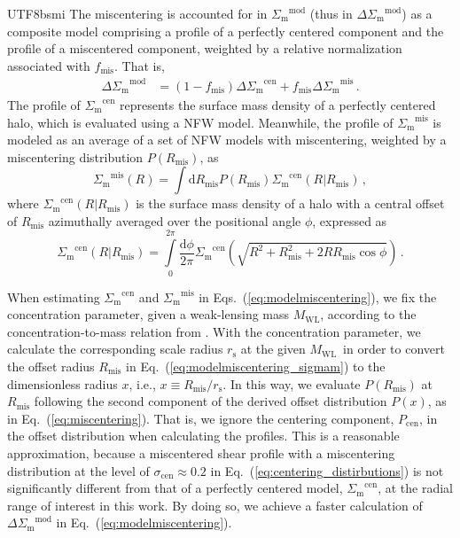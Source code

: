 \documentclass[longauth]{aa}
\newcommand{\dif}{\ensuremath{\mathrm{d}}}
\newcommand{\deltaSigma}{\ensuremath{\Delta{\Sigma}_{\mathrm{m}}}}
\newcommand{\Sigmam}{\ensuremath{{\Sigma}_{\mathrm{m}}}}
\newcommand{\Mwl}{\ensuremath{M_{\mathrm{WL}}}}
\newcommand{\fmis}{\ensuremath{f_{\mathrm{mis}}}}
\newcommand{\sigmacen}{\ensuremath{{\sigma}_{\mathrm{cen}}}}
\begin{document}
\begin{CJK*}{UTF8}{bsmi}
The miscentering is accounted for in $\Sigmam^{\mathrm{mod}}$ (thus in $\deltaSigma^{\mathrm{mod}}$) as a composite model comprising a profile of a perfectly centered component and the profile of a miscentered component, weighted by a relative normalization associated with \fmis.
That is, 
%
\begin{align}
\label{eq:modelmiscentering}
\deltaSigma^{\mathrm{mod}}
&=
\left(1 - \fmis\right)
\deltaSigma^{\mathrm{cen}}
+
\fmis
\deltaSigma^{\mathrm{mis}}
\, .
\end{align}
%
The profile of $\Sigmam^{\mathrm{cen}}$ represents the surface mass density of a perfectly centered halo, which is evaluated using a NFW model. 
Meanwhile, the profile of $\Sigmam^{\mathrm{mis}}$ is modeled as an average of a set of NFW models with miscentering, weighted by a miscentering distribution $P\left(R_{\mathrm{mis}}\right)$, as
%
\begin{equation}
\label{eq:modelmiscentering_sigmam}
\Sigmam^{\mathrm{mis}}
\left(
R
\right)
 = 
 \int
\dif R_{\mathrm{mis}}
P\left(R_{\mathrm{mis}}\right)
\Sigmam^{\mathrm{cen}}
\left(
R|R_{\mathrm{mis}}
\right)
 \, ,
\end{equation}
%
where $\Sigmam^{\mathrm{cen}}\left(R|R_{\mathrm{mis}}\right)$ is the surface mass density of a halo with a central offset of $R_{\mathrm{mis}}$ azimuthally averaged over the positional angle $\phi$, expressed as \citep{yang06, johnston07a}
%
\begin{equation}
\label{eq:modelmiscentering_sigmam_2}
\Sigmam^{\mathrm{cen}}
\left(
R|R_{\mathrm{mis}}
\right)
 = 
 \int\limits_{0}^{2\pi}
 \frac{\dif\phi}
 {2\pi} 
\Sigmam^{\mathrm{cen}}
 \left(
 \sqrt{
 R^2 + R_{\mathrm{mis}}^2 + 2 R R_{\mathrm{mis}} \cos\phi
 }
 \right)
 \, .
\end{equation}
%



When estimating 
$\Sigmam^{\mathrm{cen}}$ and $\Sigmam^{\mathrm{mis}}$ in Eqs.~(\ref{eq:modelmiscentering}),
we fix the concentration parameter, given a weak-lensing mass \Mwl,
according to the concentration-to-mass relation from \cite{diemer15}.
With the concentration parameter, we calculate the corresponding scale radius $r_{\mathrm{s}}$ at the given \Mwl\  in order to convert the offset radius $R_{\mathrm{mis}}$ in Eq.~(\ref{eq:modelmiscentering_sigmam}) to the dimensionless radius $x$,
i.e., $x\equiv R_{\mathrm{mis}}/r_{\mathrm{s}}$.
In this way, we evaluate $P\left(R_{\mathrm{mis}}\right)$ at $R_{\mathrm{mis}}$ following the second component of the derived offset distribution $P\left(x\right)$, as in Eq.~(\ref{eq:miscentering}).
That is, we ignore the centering component,  $P_{\mathrm{cen}}$, in the offset distribution when calculating the profiles.
This is a reasonable approximation, because a miscentered shear profile with a miscentering distribution 
at the level of $\sigmacen\approx0.2$
in Eq.~(\ref{eq:centering_distirbutions}) is not significantly different from that of a perfectly centered model, $\Sigmam^{\mathrm{cen}}$, at the radial range of interest in this work.
By doing so,
we achieve a faster calculation of $\deltaSigma^{\mathrm{mod}}$ in Eq.~(\ref{eq:modelmiscentering}).


\end{CJK*}
\end{document}
